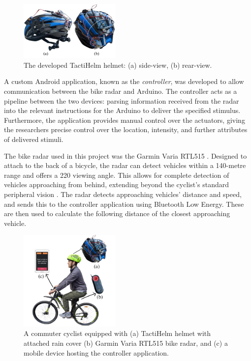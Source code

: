 \documentclass{mpaper}
\begin{document}
\begin{figure}[ht]
    \centering
    \includegraphics[width=0.44\textwidth]{images/helmet-views.pdf}
    \caption{The developed TactiHelm helmet: (a) side-view, (b) rear-view.}
    \label{fig:helmet}
\end{figure}


A custom Android application, known as the \textit{controller}, was developed to allow communication between the bike radar and Arduino. The controller acts as a pipeline between the two devices: parsing information received from the radar into the relevant instructions for the Arduino to deliver the specified stimulus. Furthermore, the application provides manual control over the actuators, giving the researchers precise control over the location, intensity, and further attributes of delivered stimuli.

The bike radar used in this project was the Garmin Varia RTL515 \cite{garminradar}. Designed to attach to the back of a bicycle, the radar can detect vehicles within a 140-metre range and offers a 220\degree{} viewing angle. This allows for complete detection of vehicles approaching from behind, extending beyond the cyclist's standard peripheral vision \cite{Spector1990VisualFields}. The radar detects approaching vehicles’ distance and speed, and sends this to the controller application using Bluetooth Low Energy. These are then used to calculate the following distance of the closest approaching vehicle. 

\begin{figure}[ht]
    \centering
    \includegraphics[width=0.44\textwidth]{dissertation/images/TactiHelm Setup.pdf}
    \caption{A commuter cyclist equipped with (a) TactiHelm helmet with attached rain cover (b) Garmin Varia RTL515 bike radar, and (c) a mobile device hosting the controller application.}
    \label{fig:setup}
\end{figure}
\end{document}
